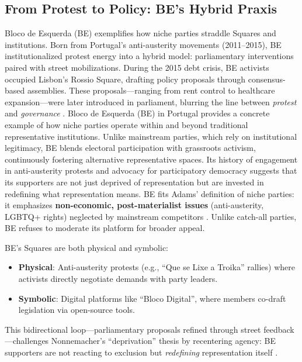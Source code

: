 \begin{greenenv}
	\subsection{From Protest to Policy: BE’s Hybrid Praxis}
	Bloco de Esquerda (BE) exemplifies how niche parties straddle Squares and institutions. Born from Portugal’s anti-austerity movements (2011–2015), BE institutionalized protest energy into a hybrid model: parliamentary interventions paired with street mobilizations. During the 2015 debt crisis, BE activists occupied Lisbon’s Rossio Square, drafting policy proposals through consensus-based assemblies. These proposals—ranging from rent control to healthcare expansion—were later introduced in parliament, blurring the line between \textit{protest} and \textit{governance} \parencite[210]{lisi2023}.
	Bloco de Esquerda (BE) in Portugal provides a concrete example of how niche parties operate within and beyond traditional representative institutions. Unlike mainstream parties, which rely on institutional legitimacy, BE blends electoral participation with grassroots activism, continuously fostering alternative representative spaces. Its history of engagement in anti-austerity protests and advocacy for participatory democracy suggests that its supporters are not just deprived of representation but are invested in redefining what representation means. BE fits Adams’ definition of niche parties: it emphasizes \textbf{non-economic, post-materialist issues} (anti-austerity, LGBTQ+ rights) neglected by mainstream competitors \parencite[3]{adams2006}. Unlike catch-all parties, BE refuses to moderate its platform for broader appeal.



	BE’s Squares are both physical and symbolic:
	\begin{itemize}
		\item \textbf{Physical}: Anti-austerity protests (e.g., \enquote{Que se Lixe a Troika} rallies) where activists directly negotiate demands with party leaders.
		\item \textbf{Symbolic}: Digital platforms like \enquote{Bloco Digital}, where members co-draft legislation via open-source tools.
	\end{itemize}
	This bidirectional loop—parliamentary proposals refined through street feedback—challenges Nonnemacher’s \enquote{deprivation} thesis by recentering agency: BE supporters are not reacting to exclusion but \textit{redefining} representation itself \parencite[45]{freire2019}.


\end{greenenv}
